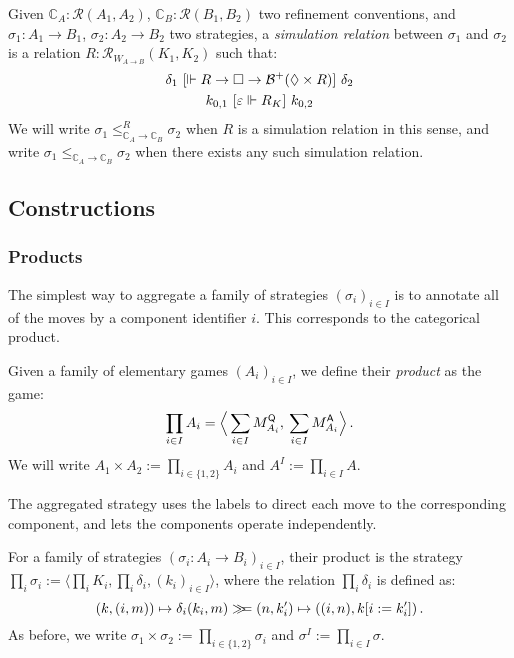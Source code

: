 \begin{definition} %
Given
$\mathbb{C}_A : \mathcal{R}(A_1, A_2)$,
$\mathbb{C}_B : \mathcal{R}(B_1, B_2)$
two refinement conventions, and
$\sigma_1 : A_1 \rightarrow B_1$,
$\sigma_2 : A_2 \rightarrow B_2$
two strategies,
a \emph{simulation relation} between $\sigma_1$ and $\sigma_2$
is a relation $R : \mathcal{R}_{W_{\!A \rightarrow B}}(K_1, K_2)$
such that:
\begin{gather*}
  \delta_1
  \ [{\Vdash R \rightarrow \Box \rightarrow \mathcal{B}^+(\Diamond \times R)}]\ 
  \delta_2
  \\
  k_{0,1} \ [{\varepsilon \Vdash R_K}]\  k_{0,2}
\end{gather*}
We will write
$\sigma_1 \le_{\mathbb{C}_A \rightarrow \mathbb{C}_B}^R \sigma_2$
when $R$ is a simulation relation in this sense, and write
$\sigma_1 \le_{\mathbb{C}_A \rightarrow \mathbb{C}_B} \sigma_2$
when there exists any such simulation relation.
\end{definition}


\subsection{Constructions} %

\subsubsection{Products} %

The simplest way to aggregate a family of strategies $(\sigma_i)_{i \in I}$
is to annotate all of the moves by a component identifier $i$.
This corresponds to the categorical product.

\begin{definition} %
Given a family of elementary games $(A_i)_{i \in I}$,
we define their \emph{product} as the game:
\[ \prod_{i \in I} A_i =
   \Big\langle \sum_{i \in I} M_{A_i}^{ \mathsf{Q} },
            \: \sum_{i \in I} M_{A_i}^{ \mathsf{A} } \Big\rangle \,. \]
We will write $A_1 \times A_2 := \prod_{i \in \{1, 2\}} A_i$
and $A^I := \prod_{i \in I} A$.
\end{definition}

The aggregated strategy uses the labels to direct each move
to the corresponding component,
and lets the components operate independently.

\begin{definition} %
For a family of strategies
$(\sigma_i : A_i \rightarrow B_i)_{i \in I}$,
their product is the strategy
$\prod_i \sigma_i := \langle \prod_i K_i, \prod_i \delta_i, (k_i)_{i\in I} \rangle$,
where the relation
$\prod_i \delta_i$
is defined as:
\[
  (k, (i, m)) \mapsto
    \delta_i(k_i, m) \gg\!\!= (n, k_i') \mapsto ((i, n), k[i := k_i']) \,.
\]
As before,
we write $\sigma_1 \times \sigma_2 := \prod_{i \in \{1, 2\}} \sigma_i$
and $\sigma^I := \prod_{i \in I} \sigma$.
\end{definition}

